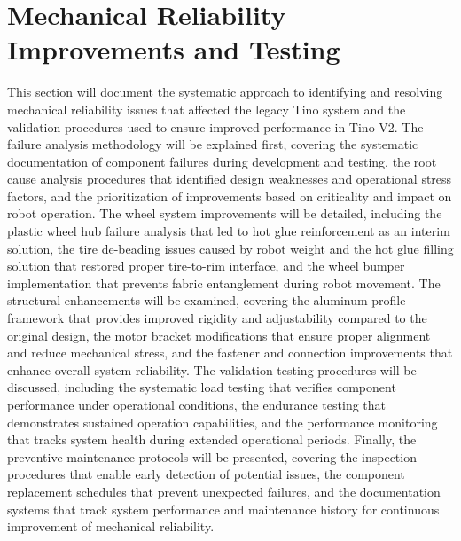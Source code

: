 \section{Mechanical Reliability Improvements and Testing}
This section will document the systematic approach to identifying and resolving mechanical reliability issues that affected the legacy Tino system and the validation procedures used to ensure improved performance in Tino V2. The failure analysis methodology will be explained first, covering the systematic documentation of component failures during development and testing, the root cause analysis procedures that identified design weaknesses and operational stress factors, and the prioritization of improvements based on criticality and impact on robot operation. The wheel system improvements will be detailed, including the plastic wheel hub failure analysis that led to hot glue reinforcement as an interim solution, the tire de-beading issues caused by robot weight and the hot glue filling solution that restored proper tire-to-rim interface, and the wheel bumper implementation that prevents fabric entanglement during robot movement. The structural enhancements will be examined, covering the aluminum profile framework that provides improved rigidity and adjustability compared to the original design, the motor bracket modifications that ensure proper alignment and reduce mechanical stress, and the fastener and connection improvements that enhance overall system reliability. The validation testing procedures will be discussed, including the systematic load testing that verifies component performance under operational conditions, the endurance testing that demonstrates sustained operation capabilities, and the performance monitoring that tracks system health during extended operational periods. Finally, the preventive maintenance protocols will be presented, covering the inspection procedures that enable early detection of potential issues, the component replacement schedules that prevent unexpected failures, and the documentation systems that track system performance and maintenance history for continuous improvement of mechanical reliability.
